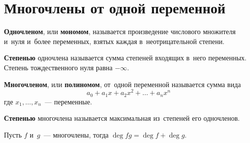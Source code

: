 \section{Многочлены от одной переменной}
\textbf{Одночленом}, или \textbf{мономом}, называется произведение числового множителя и~нуля и~более переменных, взятых каждая в~неотрицательной степени.

\textbf{Степенью} одночлена называется сумма степеней входящих в~него переменных. Степень тождественного нуля равна $-\infty$.

\textbf{Многочленом}, или \textbf{полиномом}, от~одной переменной называется сумма вида
\begin{equation*}
a_0 + a_1 x + a_2 x^2 + \ldots + a_n x^n
\end{equation*}
где $x_1, \ldots, x_n$~--- переменные.

\textbf{Степенью} многочлена называется максимальная из~степеней его одночленов.

\begin{lemma}
Пусть $f$ и~$g$~--- многочлены, тогда $\deg fg = \deg f + \deg g$.
\end{lemma}